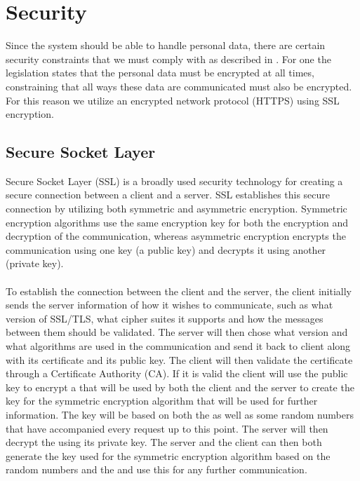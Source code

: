 \section{Security}


Since the system should be able to handle personal data, there are certain security constraints that we must comply with as described in . For one the legislation states that the personal data must be encrypted at all times, constraining that all ways these data are communicated must also be encrypted. For this reason we utilize an encrypted network protocol (HTTPS) using SSL encryption.

\subsection{Secure Socket Layer}
\label{sub:secure_socket_layer}
Secure Socket Layer (SSL) is a broadly used security technology for creating a secure connection between a client and a server. SSL establishes this secure connection by utilizing both symmetric and asymmetric encryption. Symmetric encryption algorithms use the same encryption key for both the encryption and decryption of the communication, whereas asymmetric encryption encrypts the communication using one key (a public key) and decrypts it using another (private key). 
\\\\
To establish the connection between the client and the server, the client initially sends the server information of how it wishes to communicate, such as what version of SSL/TLS, what cipher suites it supports and how the messages between them should be validated. The server will then chose what version and what algorithms are used in the communication and send it back to client along with its certificate and its public key. The client will then validate the certificate through a Certificate Authority (CA). If it is valid the client will use the public key to encrypt a  that will be used by both the client and the server to create the key for the symmetric encryption algorithm that will be used for further information. The key will be based on both the  as well as some random numbers that have accompanied every request up to this point. The server will then decrypt the  using its private key. The server and the client can then both generate the key used for the symmetric encryption algorithm based on the random numbers and the  and use this for any further communication.

